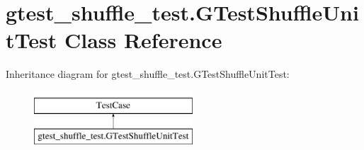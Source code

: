 \hypertarget{classgtest__shuffle__test_1_1_g_test_shuffle_unit_test}{}\section{gtest\+\_\+shuffle\+\_\+test.\+G\+Test\+Shuffle\+Unit\+Test Class Reference}
\label{classgtest__shuffle__test_1_1_g_test_shuffle_unit_test}
Inheritance diagram for gtest\+\_\+shuffle\+\_\+test.\+G\+Test\+Shuffle\+Unit\+Test\+:\begin{figure}[H]
\begin{center}
\leavevmode
\includegraphics[height=2.000000cm]{classgtest__shuffle__test_1_1_g_test_shuffle_unit_test}
\end{center}
\end{figure}
